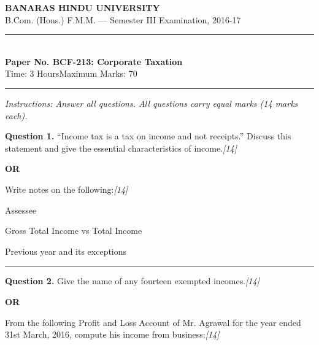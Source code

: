 \documentclass[11pt,a4paper]{article}
\newcommand{\pts}[1]{\hfill   \textit{[#1]}}
\begin{document}
\begin{center}
  {\large\bfseries BANARAS HINDU UNIVERSITY}\\[2pt]
  {\normalsize B.Com. (Hons.) F.M.M. --- Semester III Examination, 2016-17}\\[6pt]
  \rule{0.8\linewidth}{0.5pt}\\[6pt]
  {\large\bfseries Paper No. BCF-213: Corporate Taxation}\\[4pt]
  {\normalsize Time: 3 Hours\hfill Maximum Marks: 70}
\end{center}

\rule{\linewidth}{0.4pt}

\smallskip



\noindent   \textit{Instructions: Answer all questions. All questions carry equal marks (14 marks each).}

\bigskip




\noindent   \textbf{Question 1.}
``Income tax is a tax on income and not receipts.'' Discuss this statement and give the essential characteristics of income.\pts{14}

\centerline{   \textbf{OR}}

Write notes on the following:\pts{14}

\begin{parts}
  \item Assessee
  \item Gross Total Income vs Total Income
  \item Previous year and its exceptions
\end{parts}

\medskip\rule{\linewidth}{0.2pt}




\noindent   \textbf{Question 2.}
Give the name of any fourteen exempted incomes.\pts{14}

\centerline{   \textbf{OR}}

From the following Profit and Loss Account of Mr. Agrawal for the year ended 31st March, 2016, compute his income from business:\pts{14}
\end{document}
